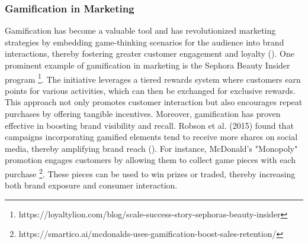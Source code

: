 \subsubsection{Gamification in Marketing}

Gamification has become a valuable tool and has revolutionized marketing strategies by embedding game-thinking scenarios for the audience into brand interactions, thereby fostering greater customer engagement and loyalty (\cite{redefinition}). 
One prominent example of gamification in marketing is the Sephora Beauty Insider program \footnote{https://loyaltylion.com/blog/scale-success-story-sephoras-beauty-insider}. 
The initiative leverages a tiered rewards system where customers earn points for various activities, which can then be exchanged for exclusive rewards. 
This approach not only promotes customer interaction but also encourages repeat purchases by offering tangible incentives. Moreover, gamification has proven effective in boosting brand visibility and recall. 
Robson et al. (2015) found that campaigns incorporating gamified elements tend to receive more shares on social media, thereby amplifying brand reach (\cite{gameon}). 
For instance, McDonald's "Monopoly" promotion engages customers by allowing them to collect game pieces with each purchase \footnote{https://smartico.ai/mcdonalds-uses-gamification-boost-sales-retention/}. 
These pieces can be used to win prizes or traded, thereby increasing both brand exposure and consumer interaction.

